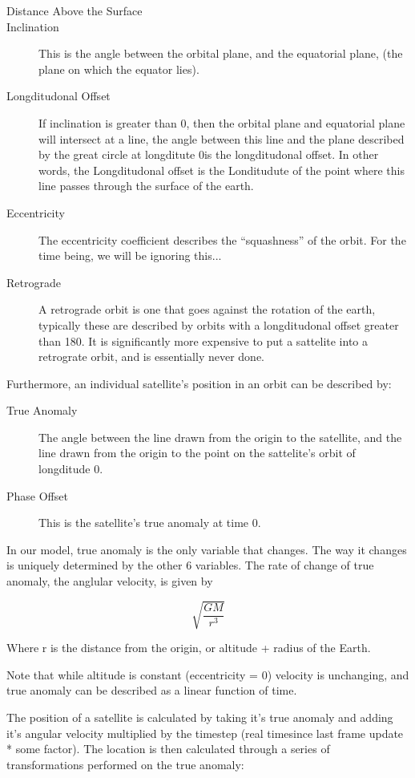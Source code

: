 \documentclass[12pt]{article}
\begin{document}
\begin{description}
\item[Distance Above the Surface]
\item[Inclination]
This is the angle between the orbital plane, and the equatorial plane, (the plane on which the equator lies).
\item[Longditudonal Offset]
If inclination is greater than 0\degree, then the orbital plane and equatorial plane will intersect at a line, the angle between this line and the plane described by the great circle at longditute 0\degree is the longditudonal offset. In other words, the Longditudonal offset is the Londitudute of the point where this line passes through the surface of the earth.
\item[Eccentricity]
The eccentricity coefficient describes the “squashness” of the orbit. For the time being, we will be ignoring this...
\item[Retrograde]
A retrograde orbit is one that goes against the rotation of the earth, typically these are described by orbits with a longditudonal offset greater than 180\degree. It is significantly more expensive to put a sattelite into a retrograte orbit, and is essentially never done.
\end{description}

Furthermore, an individual satellite's position in an orbit can be described by:

\begin{description}
\item[True Anomaly]
The angle between the line drawn from the origin to the satellite, and the line drawn from the origin to the point on the sattelite's orbit of longditude 0.
\item[Phase Offset]
This is the satellite's true anomaly at time 0.
\end{description}

In our model, true anomaly is the only variable that changes. The way it changes is uniquely determined by the other 6 variables. The rate of change of true anomaly, the anglular velocity, is given by

\[\sqrt{\frac{GM}{r^3}}\]

Where r is the distance from the origin, or altitude + radius of the Earth.

Note that while altitude is constant (eccentricity = 0) velocity is unchanging, and true anomaly can be described as a linear function of time.

The position of a satellite is calculated by taking it’s true anomaly and adding it’s angular velocity multiplied by the timestep (real timesince last frame update * some factor). The location is then calculated through a series of transformations performed on the true anomaly:
\end{document}
